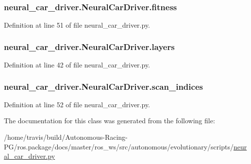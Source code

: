 \subsubsection[{\texorpdfstring{fitness}{fitness}}]{\setlength{\rightskip}{0pt plus 5cm}neural\+\_\+car\+\_\+driver.\+Neural\+Car\+Driver.\+fitness}\hypertarget{classneural__car__driver_1_1_neural_car_driver_a4d709e4419449add88e2a1a5d825e918}{}\label{classneural__car__driver_1_1_neural_car_driver_a4d709e4419449add88e2a1a5d825e918}


Definition at line 51 of file neural\+\_\+car\+\_\+driver.\+py.

\subsubsection[{\texorpdfstring{layers}{layers}}]{\setlength{\rightskip}{0pt plus 5cm}neural\+\_\+car\+\_\+driver.\+Neural\+Car\+Driver.\+layers}\hypertarget{classneural__car__driver_1_1_neural_car_driver_a425f558140c554a734fad61b9eb83940}{}\label{classneural__car__driver_1_1_neural_car_driver_a425f558140c554a734fad61b9eb83940}


Definition at line 42 of file neural\+\_\+car\+\_\+driver.\+py.

\subsubsection[{\texorpdfstring{scan\+\_\+indices}{scan_indices}}]{\setlength{\rightskip}{0pt plus 5cm}neural\+\_\+car\+\_\+driver.\+Neural\+Car\+Driver.\+scan\+\_\+indices}\hypertarget{classneural__car__driver_1_1_neural_car_driver_ac7a4e813a3f642cdb4c88a3c7bcc0ac7}{}\label{classneural__car__driver_1_1_neural_car_driver_ac7a4e813a3f642cdb4c88a3c7bcc0ac7}


Definition at line 52 of file neural\+\_\+car\+\_\+driver.\+py.



The documentation for this class was generated from the following file\+:\begin{DoxyCompactItemize}
\item 
/home/travis/build/\+Autonomous-\/\+Racing-\/\+P\+G/ros.\+package/docs/master/ros\+\_\+ws/src/autonomous/evolutionary/scripts/\hyperlink{neural__car__driver_8py}{neural\+\_\+car\+\_\+driver.\+py}\end{DoxyCompactItemize}
